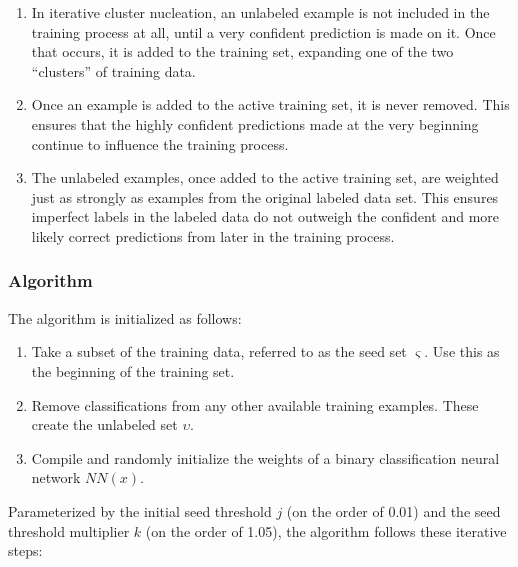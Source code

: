 \documentclass[10pt]{article}
\begin{document}
\begin{enumerate}
    \item In iterative cluster nucleation, an unlabeled example is not included in the training process at all, until a very confident prediction is made on it. Once that occurs, it is added to the training set, expanding one of the two ``clusters'' of training data.
    \item Once an example is added to the active training set, it is never removed. This ensures that the highly confident predictions made at the very beginning continue to influence the training process.
    \item The unlabeled examples, once added to the active training set, are weighted just as strongly as examples from the original labeled data set. This ensures imperfect labels in the labeled data do not outweigh the confident and more likely correct predictions from later in the training process.
\end{enumerate}

\subsubsection{Algorithm}

The algorithm is initialized as follows:

\begin{enumerate}
    \item Take a subset of the training data, referred to as the seed set $\varsigma$. Use this as the beginning of the training set.
    \item Remove classifications from any other available training examples. These create the unlabeled set $\upsilon$.
    \item Compile and randomly initialize the weights of a binary classification neural network $NN(x)$.
\end{enumerate}

Parameterized by the initial seed threshold $j$ (on the order of 0.01) and the seed threshold multiplier $k$ (on the order of 1.05), the algorithm follows these iterative steps:
\end{document}
